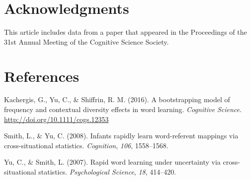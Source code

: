 \documentclass[man,floatsintext]{apa6}
\begin{document}
\hypertarget{acknowledgments}{%
\section{Acknowledgments}\label{acknowledgments}}

This article includes data from a paper that appeared in the Proceedings of the 31st Annual Meeting of the Cognitive Science Society.

\newpage

\hypertarget{references}{%
\section{References}\label{references}}

\begingroup
\setlength{\parindent}{-0.5in}
\setlength{\leftskip}{0.5in}

\hypertarget{refs}{}
\leavevmode\hypertarget{ref-Kachergis2016}{}%
Kachergis, G., Yu, C., \& Shiffrin, R. M. (2016). A bootstrapping model of frequency and contextual diversity effects in word learning. \emph{Cognitive Science}. \url{http://doi.org/10.1111/cogs.12353}

\leavevmode\hypertarget{ref-Smith2008}{}%
Smith, L., \& Yu, C. (2008). Infants rapidly learn word-referent mappings via cross-situational statistics. \emph{Cognition}, \emph{106}, 1558--1568.

\leavevmode\hypertarget{ref-Yu2007}{}%
Yu, C., \& Smith, L. (2007). Rapid word learning under uncertainty via cross-situational statistics. \emph{Psychological Science}, \emph{18}, 414--420.

\endgroup
\end{document}
